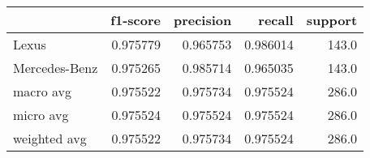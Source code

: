 \begin{tabular}{lrrrr}
\toprule
{} &  f1-score &  precision &    recall &  support \\
\midrule
Lexus         &  0.975779 &   0.965753 &  0.986014 &    143.0 \\
Mercedes-Benz &  0.975265 &   0.985714 &  0.965035 &    143.0 \\
macro avg     &  0.975522 &   0.975734 &  0.975524 &    286.0 \\
micro avg     &  0.975524 &   0.975524 &  0.975524 &    286.0 \\
weighted avg  &  0.975522 &   0.975734 &  0.975524 &    286.0 \\
\bottomrule
\end{tabular}
